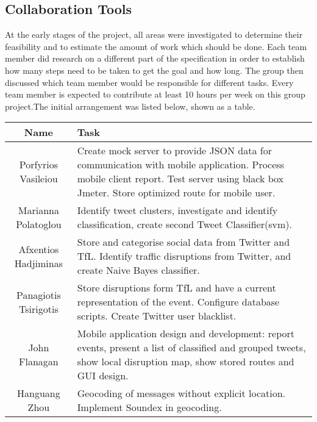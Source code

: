 \subsection{Collaboration Tools}
At the early stages of the project, all areas were investigated to determine their feasibility and to estimate the amount of work which should be done. Each team member did research on a different part of the specification in order to establish how many steps need to be taken to get the goal and how long. The group then discussed which team member would be responsible for different tasks. Every team member is expected to contribute at least 10 hours per week on this group project.The initial arrangement was listed below, shown as a table.\\
\begin{tabular}{|c|p{11.5cm}|}
\hline
Name&Task\\
\hline
Porfyrios Vasileiou&Create mock server to provide JSON data for communication with mobile application. Process mobile client report. Test server using black box Jmeter. Store optimized route for mobile user.\\
\hline
Marianna Polatoglou&Identify tweet clusters, investigate and identify classification, create second Tweet Classifier(svm).\\
\hline
Afxentios Hadjiminas&Store and categorise social data from Twitter and TfL. Identify traffic disruptions from Twitter, and create Naive Bayes classifier.\\
\hline
Panagiotis Tsirigotis&Store disruptions form TfL and have a current representation of the event. Configure database scripts. Create Twitter user blacklist.\\
\hline
John Flanagan&Mobile application design and development: report events, present a list of classified and grouped tweets, show local disruption map, show stored routes and GUI design.\\
\hline
Hanguang Zhou&Geocoding of messages without explicit location. Implement Soundex in geocoding.\\
\hline
\end{tabular}